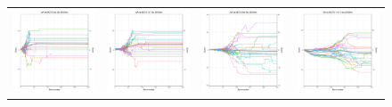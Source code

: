 \begin{figure}
\begin{tabular}{cccc}
\hspace{-0.5cm}\includegraphics[width = 1.55in]{images/Visualizations/GAvsMCTS/2000ms5x5.png} &
\hspace{-0.5cm}\includegraphics[width = 1.55in]{images/Visualizations/GAvsMCTS/2000ms7x7.png} &
\hspace{-0.5cm}\includegraphics[width = 1.55in]{images/Visualizations/GAvsMCTS/2000ms9x9.png} &
\hspace{-0.5cm}\includegraphics[width = 1.55in]{images/Visualizations/GAvsMCTS/2000ms11x11.png} \\


\end{tabular}
\end{figure}
